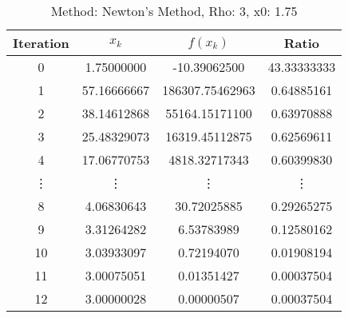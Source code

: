 \begin{table}
\centering
\caption{Method: Newton's Method, Rho: 3, x0: 1.75}
\label{tab:table_Newton's_Method_3_1_75}
\begin{tabular}{c c c c}
\toprule
Iteration &       $x_k$ &        $f(x_k)$ &       Ratio \\
\midrule
        0 &  1.75000000 &    -10.39062500 & 43.33333333 \\
        1 & 57.16666667 & 186307.75462963 &  0.64885161 \\
        2 & 38.14612868 &  55164.15171100 &  0.63970888 \\
        3 & 25.48329073 &  16319.45112875 &  0.62569611 \\
        4 & 17.06770753 &   4818.32717343 &  0.60399830 \\
   \vdots &      \vdots &          \vdots &      \vdots \\
        8 &  4.06830643 &     30.72025885 &  0.29265275 \\
        9 &  3.31264282 &      6.53783989 &  0.12580162 \\
       10 &  3.03933097 &      0.72194070 &  0.01908194 \\
       11 &  3.00075051 &      0.01351427 &  0.00037504 \\
       12 &  3.00000028 &      0.00000507 &  0.00037504 \\
\bottomrule
\end{tabular}
\end{table}

